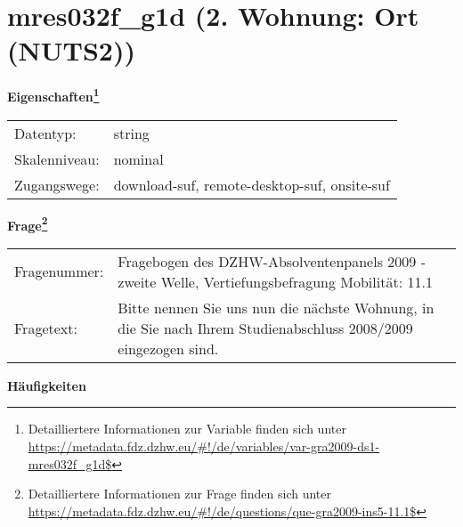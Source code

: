 
    \setcounter{footnote}{0}

    \vspace*{-1.8cm}
	\section{mres032f\_g1d (2. Wohnung: Ort (NUTS2))}
	\label{section:mres032f_g1d}



    \vspace*{0.5cm}
    \noindent\textbf{Eigenschaften\footnote{Detailliertere Informationen zur Variable finden sich unter
		\url{https://metadata.fdz.dzhw.eu/\#!/de/variables/var-gra2009-ds1-mres032f_g1d$}}}\\
	\begin{tabularx}{\hsize}{@{}lX}
	Datentyp: & string \\
	Skalenniveau: & nominal \\
	Zugangswege: &
	  download-suf, 
	  remote-desktop-suf, 
	  onsite-suf
 \\
    \end{tabularx}



				\vspace*{0.5cm}
                \noindent\textbf{Frage\footnote{Detailliertere Informationen zur Frage finden sich unter
		              \url{https://metadata.fdz.dzhw.eu/\#!/de/questions/que-gra2009-ins5-11.1$}}}\\
				\begin{tabularx}{\hsize}{@{}lX}
					Fragenummer: &
					  Fragebogen des DZHW-Absolventenpanels 2009 - zweite Welle, Vertiefungsbefragung Mobilität:
					  11.1
 \\
					Fragetext: & Bitte nennen Sie uns nun die nächste Wohnung, in die Sie nach Ihrem Studienabschluss 2008/2009 eingezogen sind. \\
				\end{tabularx}





        		\vspace*{0.5cm}
                \noindent\textbf{Häufigkeiten}


